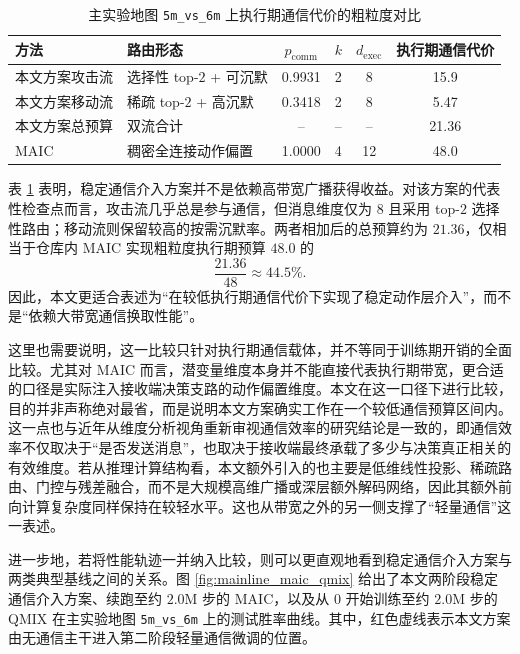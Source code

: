 \begin{table}[htbp]
    \centering
    \caption{主实验地图 \texttt{5m\_vs\_6m} 上执行期通信代价的粗粒度对比}
    \label{tab:comm_cost_compare}
    {\renewcommand{\arraystretch}{1.28}
    \setlength{\extrarowheight}{1pt}
    \setlength{\tabcolsep}{7pt}
    \begin{tabular}{p{3.9cm}p{4.2cm}cccc}
        \toprule
        方法 & 路由形态 & $p_{\mathrm{comm}}$ & $k$ & $d_{\mathrm{exec}}$ & 执行期通信代价 \\
        \midrule
        本文方案攻击流 & 选择性 top-$2$ + 可沉默 & 0.9931 & 2 & 8 & 15.9 \\
        本文方案移动流 & 稀疏 top-$2$ + 高沉默 & 0.3418 & 2 & 8 & 5.47 \\
        本文方案总预算 & 双流合计 & -- & -- & -- & 21.36 \\
        MAIC & 稠密全连接动作偏置 & 1.0000 & 4 & 12 & 48.0 \\
        \bottomrule
    \end{tabular}
    }
\end{table}

表 \ref{tab:comm_cost_compare} 表明，稳定通信介入方案并不是依赖高带宽广播获得收益。对该方案的代表性检查点而言，攻击流几乎总是参与通信，但消息维度仅为 8 且采用 top-$2$ 选择性路由；移动流则保留较高的按需沉默率。两者相加后的总预算约为 $21.36$，仅相当于仓库内 MAIC 实现粗粒度执行期预算 $48.0$ 的
\begin{equation}
\frac{21.36}{48} \approx 44.5\%.
\end{equation}
因此，本文更适合表述为“在较低执行期通信代价下实现了稳定动作层介入”，而不是“依赖大带宽通信换取性能”。

这里也需要说明，这一比较只针对执行期通信载体，并不等同于训练期开销的全面比较。尤其对 MAIC 而言，潜变量维度本身并不能直接代表执行期带宽，更合适的口径是实际注入接收端决策支路的动作偏置维度。本文在这一口径下进行比较，目的并非声称绝对最省，而是说明本文方案确实工作在一个较低通信预算区间内。这一点也与近年从维度分析视角重新审视通信效率的研究结论是一致的，即通信效率不仅取决于“是否发送消息”，也取决于接收端最终承载了多少与决策真正相关的有效维度\cite{sun2025drmac}。若从推理计算结构看，本文额外引入的也主要是低维线性投影、稀疏路由、门控与残差融合，而不是大规模高维广播或深层额外解码网络，因此其额外前向计算复杂度同样保持在较轻水平。这也从带宽之外的另一侧支撑了“轻量通信”这一表述。

进一步地，若将性能轨迹一并纳入比较，则可以更直观地看到稳定通信介入方案与两类典型基线之间的关系。图 \ref{fig:mainline_maic_qmix} 给出了本文两阶段稳定通信介入方案、续跑至约 $2.0$M 步的 MAIC，以及从 $0$ 开始训练至约 $2.0$M 步的 QMIX 在主实验地图 \texttt{5m\_vs\_6m} 上的测试胜率曲线。其中，红色虚线表示本文方案由无通信主干进入第二阶段轻量通信微调的位置。

